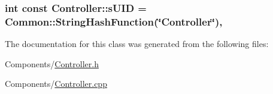 \subsubsection[{\texorpdfstring{s\+U\+ID}{sUID}}]{\setlength{\rightskip}{0pt plus 5cm}int const Controller\+::s\+U\+ID = {\bf Common\+::\+String\+Hash\+Function}(\char`\"{}Controller\char`\"{})\hspace{0.3cm}{\ttfamily [static]}, {\ttfamily [private]}}\hypertarget{classController_a21bfc63815a3008d5e4f095a3494bf18}{}\label{classController_a21bfc63815a3008d5e4f095a3494bf18}


The documentation for this class was generated from the following files\+:\begin{DoxyCompactItemize}
\item 
Components/\hyperlink{Controller_8h}{Controller.\+h}\item 
Components/\hyperlink{Controller_8cpp}{Controller.\+cpp}\end{DoxyCompactItemize}
